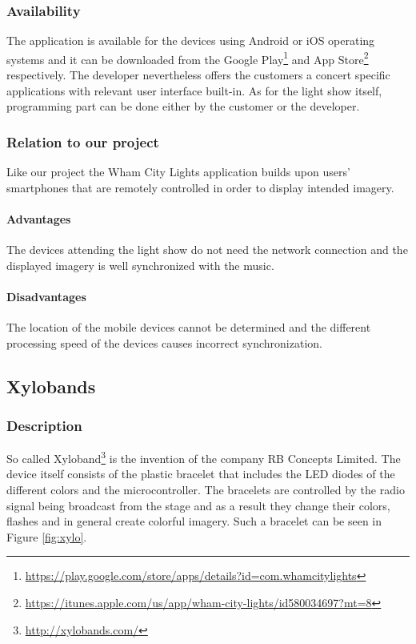 \subsubsection{Availability}
The application is available for the devices using Android or iOS operating systems and it can be downloaded from the Google Play\footnote{\url{https://play.google.com/store/apps/details?id=com.whamcitylights}} and App Store\footnote{\url{https://itunes.apple.com/us/app/wham-city-lights/id580034697?mt=8}} respectively. The developer nevertheless offers the customers a concert specific applications with relevant user interface built-in. As for the light show itself, programming part can be done either by the customer or the developer.

\subsubsection{Relation to our project}
Like our project the Wham City Lights application builds upon users' smartphones that are remotely controlled in order to display intended imagery. 

\paragraph{Advantages}
The devices attending the light show do not need the network connection and the displayed imagery is well synchronized with the music.

\paragraph{Disadvantages}
The location of the mobile devices cannot be determined and the different processing speed of the devices causes incorrect synchronization.


\subsection{Xylobands}

\subsubsection{Description}
So called Xyloband\footnote{\url{http://xylobands.com/}} is the invention of the company RB Concepts Limited. The device itself consists of the plastic bracelet that includes the LED diodes of the different colors and the microcontroller. 
The bracelets are controlled by the radio signal being broadcast from the stage and as a result they change their colors, flashes and in general create colorful imagery.
Such a bracelet can be seen in Figure \ref{fig:xylo}.

